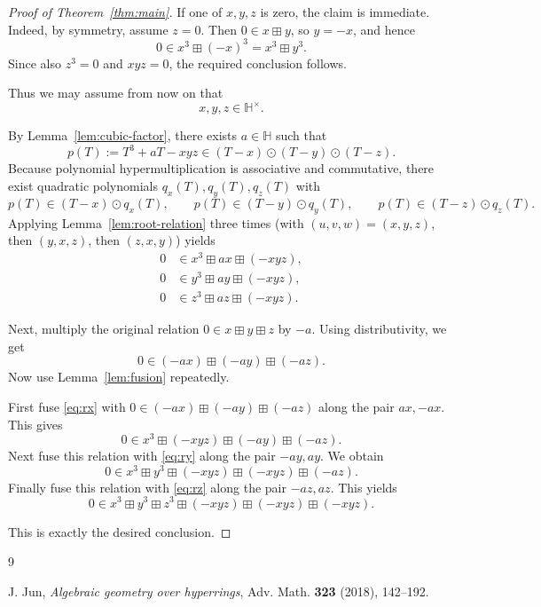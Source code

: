 \documentclass[11pt]{article}
\begin{document}
\begin{proof}[Proof of Theorem~\ref{thm:main}]
If one of $x,y,z$ is zero, the claim is immediate. Indeed, by symmetry,
assume $z=0$. Then $0\in x\boxplus y$, so $y=-x$, and hence
\[
0\in x^3\boxplus (-x)^3 = x^3\boxplus y^3.
\]
Since also $z^3=0$ and $xyz=0$, the required conclusion follows.

Thus we may assume from now on that
\[
x,y,z\in \mathbb H^\times.
\]

By Lemma~\ref{lem:cubic-factor}, there exists $a\in \mathbb H$ such that
\[
p(T):=T^3+aT-xyz \in (T-x)\odot (T-y)\odot (T-z).
\]
Because polynomial hypermultiplication is associative and commutative,
there exist quadratic polynomials $q_x(T),q_y(T),q_z(T)$ with
\[
p(T)\in (T-x)\odot q_x(T),\qquad
p(T)\in (T-y)\odot q_y(T),\qquad
p(T)\in (T-z)\odot q_z(T).
\]
Applying Lemma~\ref{lem:root-relation} three times (with
$(u,v,w)=(x,y,z)$, then $(y,x,z)$, then $(z,x,y)$) yields
\begin{align}
0&\in x^3\boxplus ax\boxplus (-xyz),\label{eq:rx}\\
0&\in y^3\boxplus ay\boxplus (-xyz),\label{eq:ry}\\
0&\in z^3\boxplus az\boxplus (-xyz).\label{eq:rz}
\end{align}

Next, multiply the original relation $0\in x\boxplus y\boxplus z$ by $-a$.
Using distributivity, we get
\[
0\in (-ax)\boxplus (-ay)\boxplus (-az).
\]
Now use Lemma~\ref{lem:fusion} repeatedly.

First fuse \eqref{eq:rx} with
$0\in (-ax)\boxplus (-ay)\boxplus (-az)$ along the pair $ax,-ax$. This gives
\[
0\in x^3\boxplus (-xyz)\boxplus (-ay)\boxplus (-az).
\]
Next fuse this relation with \eqref{eq:ry} along the pair $-ay,ay$. We obtain
\[
0\in x^3\boxplus y^3\boxplus (-xyz)\boxplus (-xyz)\boxplus (-az).
\]
Finally fuse this relation with \eqref{eq:rz} along the pair $-az,az$. This yields
\[
0\in x^3\boxplus y^3\boxplus z^3\boxplus (-xyz)\boxplus (-xyz)\boxplus (-xyz).
\]

This is exactly the desired conclusion.
\end{proof}

\begin{thebibliography}{9}

J. Jun,
\emph{Algebraic geometry over hyperrings},
Adv. Math. \textbf{323} (2018), 142--192.

\end{thebibliography}
\end{document}
